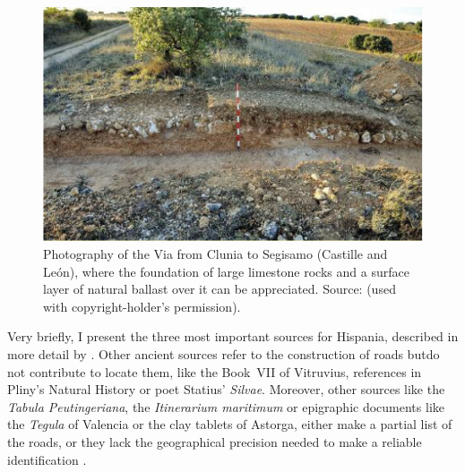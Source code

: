 	\begin{figure}[!htb]
		\includegraphics[width=\linewidth]{figures/verdu_Fig2}
		\caption{Photography of the Via from Clunia to Segisamo (Castille and León), where the foundation of large limestone rocks and a surface layer of natural ballast over it can be appreciated. Source: \textcite[24]{Moreno_2004} (used with copyright-holder’s permission).}
		\label{fig:verdu_Fig2}
	\end{figure}	
Very  briefly, I present the three most important sources for Hispania, described in more detail by \textcite{Roldán_1975}. Other ancient sources refer to the construction of roads butdo not contribute to locate them, like the Book~VII of Vitruvius, references in Pliny’s Natural History or poet Statius’ \textit{Silvae}. Moreover, other sources like the \textit{Tabula Peutingeriana}, the \textit{Itinerarium maritimum} or epigraphic documents like the \textit{Tegula} of Valencia or the clay tablets of Astorga, either make a partial list of the roads, or they lack the geographical precision needed to make a reliable identification \parencites[3]{Arias_1987}[102--175]{Roldán_1975}.
	
